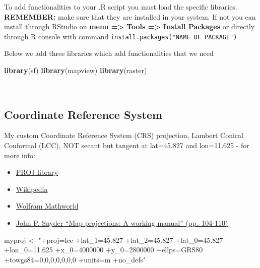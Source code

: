 \documentclass[]{article}
\newenvironment{Shaded}{\begin{snugshade}}{\end{snugshade}}
\newcommand{\KeywordTok}[1]{\textcolor[rgb]{0.13,0.29,0.53}{\textbf{#1}}}
\newcommand{\NormalTok}[1]{#1}
\newcommand{\StringTok}[1]{\textcolor[rgb]{0.31,0.60,0.02}{#1}}
\providecommand{\tightlist}{%
  \setlength{\itemsep}{0pt}\setlength{\parskip}{0pt}}
\begin{document}
To add functionalities to your .R script you must load the specific
libraries. \textbf{REMEMBER:} make sure that they are installed in your
system. If not you can install through RStudio on \textbf{menu
=\textgreater{} Tools =\textgreater{} Install Packages} or directly
through R console with command
\texttt{install.packages("NAME\ OF\ PACKAGE")}

Below we add three libraries which add functionalities that we need

\begin{Shaded}
\begin{Highlighting}[]
\KeywordTok{library}\NormalTok{(sf)}
\KeywordTok{library}\NormalTok{(mapview)}
\KeywordTok{library}\NormalTok{(raster)}
\end{Highlighting}
\end{Shaded}

~

\hypertarget{coordinate-reference-system}{%
\subsection{Coordinate Reference
System}\label{coordinate-reference-system}}

My custom Coordinate Reference System (CRS) projection, Lambert Conical
Conformal (LCC), NOT secant but tangent at lat=45.827 and lon=11.625 -
for more info:

\begin{itemize}
\tightlist
\item
  \href{https://proj.org/operations/projections/lcc.html}{PROJ
  library}\\
\item
  \href{https://en.wikipedia.org/wiki/Lambert_conformal_conic_projection}{Wikipedia}\\
\item
  \href{http://mathworld.wolfram.com/LambertConformalConicProjection.html}{Wolfram
  Mathworld}\\
\item
  \href{https://pubs.er.usgs.gov/publication/pp1395}{John P. Snyder
  ``Map projections: A working manual'' (pp.~104-110)}
\end{itemize}

\begin{Shaded}
\begin{Highlighting}[]
\NormalTok{myproj <-}\StringTok{ "+proj=lcc +lat_1=45.827  +lat_2=45.827  +lat_0=45.827 +lon_0=11.625 +x_0=4000000 +y_0=2800000 +ellps=GRS80 +towgs84=0,0,0,0,0,0,0 +units=m +no_defs"}
\end{Highlighting}
\end{Shaded}
\end{document}
